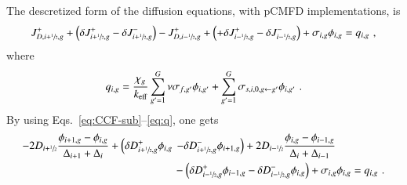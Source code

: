 \documentclass[review,3p,onecolumn,sort&compress]{elsarticle}
\newcommand{\eq}[1]{Eq.~(\ref{#1})}
\newcommand{\keff}{\ensuremath{k_{\textrm{\scriptsize{eff}}}}}
\newcommand{\jp}{\ensuremath{J^+}}
\newcommand{\jm}{\ensuremath{J^-}}
\newcommand{\jpm}{\ensuremath{J^\pm}}
\newcommand{\delj}{\ensuremath{\delta J}}
\newcommand{\jD}{\ensuremath{J^{\textrm{\scriptsize{D}}}}}
\newcommand{\hzi}{\ensuremath{\sfrac{1}{2}}}
\newcommand{\dx}{\Delta}
\newcommand{\dd}{\delta D}
\begin{document}
The descretized form of the diffusion equations, with pCMFD implementations, is
\begin{equation}
	\label{eq:pCMFD-diff1}
	J_{D,i+\hzi,g}^+ +\left( \delj_{i+\hzi,g}^+ - \delj_{i+\hzi,g}^- \right) - J_{D,i-\hzi,g}^+ + \left( + \delj_{i-\hzi,g}^+ - 
	\delj_{i-\hzi,g}^- \right) + \sigma_{i,g}\phi_{i,g} = q_{i,g}\,\,,
\end{equation}
where
\begin{equation}
	\label{eq:q}
	q_{i,g} = \frac{\chi_g}{\keff}\sum\limits^G_{g'=1}\nu\sigma_{f,g'}\phi_{i,g'} + \sum\limits_{g'=1}^G \sigma_{s,i,0,g\leftarrow g'}\phi_{i,g'}\,\,.
\end{equation}
By using Eqs.~\eqref{eq:CCF-sub}--\eqref{eq:q}, one gets
\begin{equation}
	\label{eq:pCMFD-diff2}
	\begin{split}
	-2D_{i+\hzi}\frac{\phi_{i+1,g} - \phi_{i,g}}{\dx_{i+1}+\dx_{i}} +\left( \dd^+_{i+\hzi,g}\phi_{i,g} \right.&\left. - \dd^-_{i+\hzi,g }\phi_{i+1,g}\right)
	+2D_{i-\hzi}\frac{\phi_{i,g} - \phi_{i-1,g}}{\dx_{i}+\dx_{i-1}} \\ 
	&- \left( \dd^+_{i-\hzi,g}\phi_{i-1,g} -\dd^-_{i-\hzi,g}\phi_{i,g}\right) +\sigma_{i,g}\phi_{i,g} = q_{i,g}\,\,.
	\end{split}
\end{equation}
\end{document}
